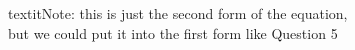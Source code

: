 \documentclass[preview]{standalone}
\begin{document}
\begin{center}
\raggedright
                textit{Note: } this is just the second form of the equation, \\
                but we could put it into the first form like Question 5
\end{center}
\end{document}
